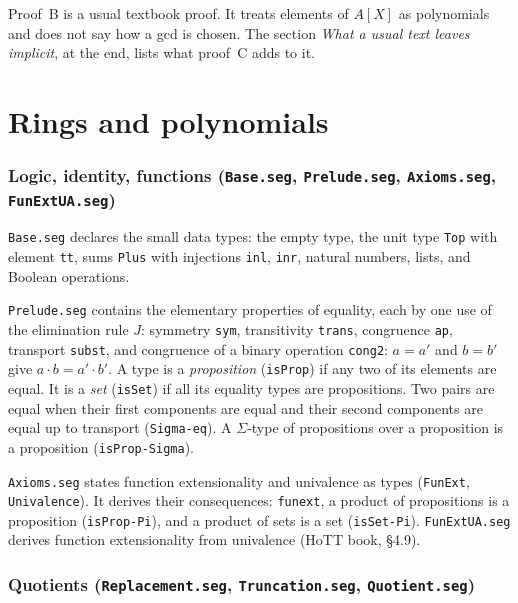 \documentclass[11pt]{amsart}
\theoremstyle{definition}
\theoremstyle{remark}
\newcommand{\nm}[1]{\textup{\texttt{#1}}}
\newcommand{\file}[1]{\textup{\texttt{#1.seg}}}
\begin{document}
\noindent Proof~B is a usual textbook proof. It treats elements of
$A[X]$ as polynomials and does not say how a gcd is chosen. The section
\emph{What a usual text leaves implicit}, at the end, lists what proof~C
adds to it.

\part{Rings and polynomials}\label{part:base}

\section{Logic, identity, functions (\file{Base}, \file{Prelude},
\file{Axioms}, \file{FunExtUA})}

\file{Base} declares the small data types: the empty type, the unit type
\nm{Top} with element \nm{tt}, sums \nm{Plus} with injections \nm{inl},
\nm{inr}, natural numbers, lists, and Boolean operations.

\file{Prelude} contains the elementary properties of equality, each by one
use of the elimination rule $J$: symmetry \nm{sym}, transitivity
\nm{trans}, congruence \nm{ap}, transport \nm{subst}, and congruence of a
binary operation \nm{cong2}: $a=a'$ and $b=b'$ give
$a\cdot b = a'\cdot b'$. A type is a \emph{proposition} (\nm{isProp}) if
any two of its elements are equal. It is a \emph{set} (\nm{isSet}) if all
its equality types are propositions. Two pairs are equal when their
first components are equal and their second components are equal up to
transport (\nm{Sigma-eq}). A $\Sigma$-type of propositions over a
proposition is a proposition (\nm{isProp-Sigma}).

\file{Axioms} states function extensionality and univalence as types
(\nm{FunExt}, \nm{Univalence}). It derives their consequences:
\nm{funext}, a product of propositions is a proposition
(\nm{isProp-Pi}), and a product of sets is a set (\nm{isSet-Pi}).
\file{FunExtUA} derives function extensionality from univalence (HoTT
book, \S4.9).

\section{Quotients (\file{Replacement}, \file{Truncation},
\file{Quotient})}
\end{document}
